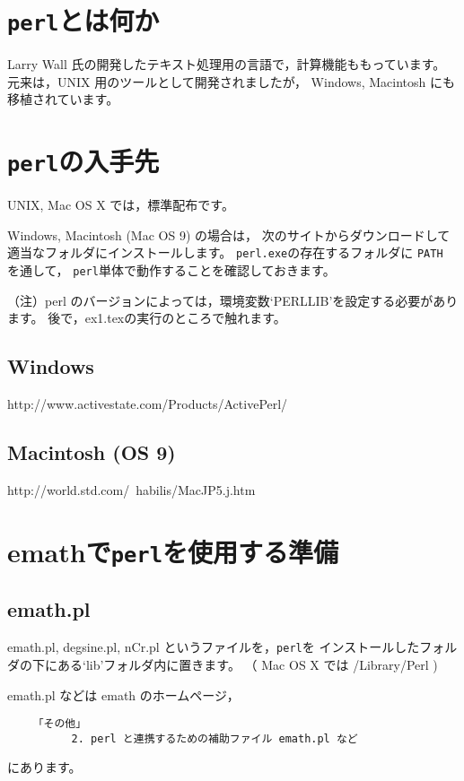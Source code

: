 \documentclass[a4j,fleqn]{jarticle}
\begin{document}
\section{\texttt{perl}とは何か}
Larry Wall 氏の開発したテキスト処理用の言語で，計算機能ももっています。
元来は，UNIX 用のツールとして開発されましたが，
Windows, Macintosh にも移植されています。

\section{\texttt{perl}の入手先}
UNIX, Mac OS X では，標準配布です。

Windows, Macintosh (Mac OS 9) の場合は，
次のサイトからダウンロードして適当なフォルダにインストールします。
\texttt{perl.exe}の存在するフォルダに \texttt{PATH} を通して，
\texttt{perl}単体で動作することを確認しておきます。

（注）perl のバージョンによっては，環境変数`PERLLIB'を設定する必要があります。
後で，\textsf{ex1.tex}の実行のところで触れます。
\fi

\subsection{Windows}
http://www.activestate.com/Products/ActivePerl/

\subsection{Macintosh (OS 9)}
http://world.std.com/~habilis/MacJP5.j.htm

\section{\textsf{emath}で\texttt{perl}を使用する準備}
\subsection{\textsf{emath.pl}}
\textsf{emath.pl, degsine.pl, nCr.pl} というファイルを，\texttt{perl}を
インストールしたフォルダの下にある`lib'フォルダ内に置きます。
（ Mac OS X では /Library/Perl )

\textsf{emath.pl} などは emath のホームページ，
\begin{jquote}
\begin{verbatim}
    「その他」
          2. perl と連携するための補助ファイル emath.pl など
\end{verbatim}
\end{jquote}
にあります。
\end{document}
